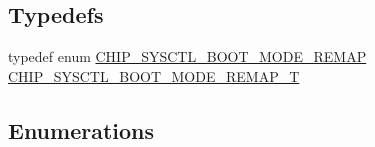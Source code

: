 \subsection*{Typedefs}
\begin{DoxyCompactItemize}
\item 
typedef enum \hyperlink{group__SYSCTL__17XX__40XX_ga08779259bb52e97fa1491aa0047da2c6}{C\+H\+I\+P\+\_\+\+S\+Y\+S\+C\+T\+L\+\_\+\+B\+O\+O\+T\+\_\+\+M\+O\+D\+E\+\_\+\+R\+E\+M\+AP} \hyperlink{group__SYSCTL__17XX__40XX_gaacc03dffa90a522f3fc992e9940d196e}{C\+H\+I\+P\+\_\+\+S\+Y\+S\+C\+T\+L\+\_\+\+B\+O\+O\+T\+\_\+\+M\+O\+D\+E\+\_\+\+R\+E\+M\+A\+P\+\_\+T}
\end{DoxyCompactItemize}
\subsection*{Enumerations}
